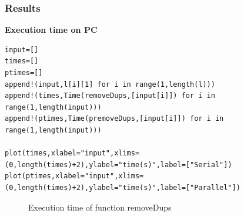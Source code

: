 \documentclass[a4paper,12pt]{article}
\begin{document}
\subsubsection{Results}
\textbf{Execution time on PC}
\begin{Verbatim}[fontsize=\footnotesize]
input=[]
times=[]
ptimes=[]
append!(input,l[i][1] for i in range(1,length(l)))
append!(times,Time(removeDups,[input[i]]) for i in range(1,length(input)))
append!(ptimes,Time(premoveDups,[input[i]]) for i in range(1,length(input)))

plot(times,xlabel="input",xlims=(0,length(times)+2),ylabel="time(s)",label=["Serial"])
plot(ptimes,xlabel="input",xlims=(0,length(times)+2),ylabel="time(s)",label=["Parallel"])
\end{Verbatim}
\begin{figure}[!h]
	\centering
	\caption{Execution time of function removeDups}
\end{figure}
\newpage
\end{document}
